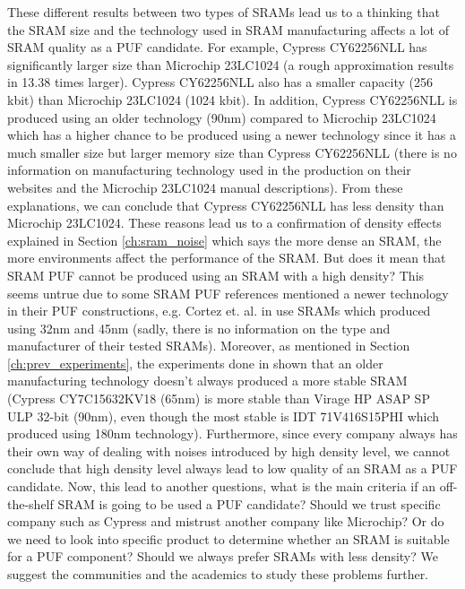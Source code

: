These different results between two types of SRAMs lead us to a thinking that the SRAM size and the technology used in SRAM manufacturing affects a lot of SRAM quality as a PUF candidate. For example, Cypress CY62256NLL has significantly larger size than Microchip 23LC1024 (a rough approximation results in 13.38 times larger). Cypress CY62256NLL also has a smaller capacity (256 kbit) than Microchip 23LC1024 (1024 kbit). In addition, Cypress CY62256NLL is produced using an older technology (90nm) compared to Microchip 23LC1024 which has a higher chance to be produced using a newer technology since it has a much smaller size but larger memory size than Cypress CY62256NLL (there is no information on manufacturing technology used in the production on their websites and the Microchip 23LC1024 manual descriptions). From these explanations, we can conclude that Cypress CY62256NLL has less density than Microchip 23LC1024. These reasons lead us to a confirmation of density effects  explained in Section \ref{ch:sram_noise} which says the more dense an SRAM, the more environments affect the performance of the SRAM. But does it mean that SRAM PUF cannot be produced using an SRAM with a high density? This seems untrue due to some SRAM PUF references mentioned a newer technology in their PUF constructions, e.g. Cortez et. al. in \cite{7102498} use SRAMs which produced using 32nm and 45nm (sadly, there is no information on the type and manufacturer of their tested SRAMs). Moreover, as mentioned in Section \ref{ch:prev_experiments}, the experiments done in \cite{Schrijen:2012:CAS:2492708.2493033} shown that an older manufacturing technology doesn't always produced a more stable SRAM (Cypress CY7C15632KV18 (65nm) is more stable than Virage HP ASAP SP ULP 32-bit (90nm), even though the most stable is IDT 71V416S15PHI which produced using 180nm technology).
Furthermore, since every company always has their own way of dealing with noises introduced by high density level, we cannot conclude that high density level always lead to low quality of an SRAM as a PUF candidate. Now, this lead to another questions, what is the main criteria if an off-the-shelf SRAM is going to be used a PUF candidate? Should we trust specific company such as Cypress and mistrust another company like Microchip? Or do we need to look into specific product to determine whether an SRAM is suitable for a PUF component? Should we always prefer SRAMs with less density?
We suggest the communities and the academics to study these problems further.

